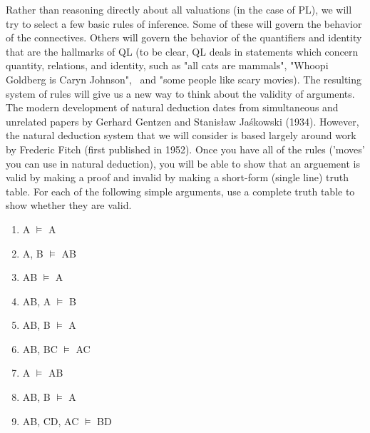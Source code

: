 Rather than reasoning directly about all valuations (in the case of PL), we will try to select a few basic rules of inference. Some of these will govern the behavior of the connectives. Others will govern the behavior of the quantifiers and identity that are the hallmarks of QL (to be clear, QL deals in statements which concern quantity, relations, and identity, such as "all cats are mammals", "Whoopi Goldberg is Caryn Johnson",  and "some people like scary movies). The resulting system of rules will give us a new way to think about the validity of arguments. The modern development of natural deduction dates from simultaneous and unrelated papers by Gerhard Gentzen and Stanisław Jaśkowski (1934). However, the natural deduction system that we will consider is based largely around work by Frederic Fitch (first published in 1952). Once you have all of the rules ('moves' you can use in natural deduction), you will be able to show that an arguement is valid by making a proof and invalid by making a short-form (single line) truth table. 
\practiceproblems
\problempart
\label{pr.basicinferencerulestables}
For each of the following simple arguments, use a complete truth table to show whether they are valid. 
\begin{enumerate}
\item A $\vDash$ A
\item A, B $\vDash$ A\eand B
\item A\eand B $\vDash$ A
\item A\eif B, A $\vDash$ B
\item A\eif B, \enot B $\vDash$ \enot A
\item A\eif B, B\eif C $\vDash$ A\eif C
\item A $\vDash$ A\eor B
\item A\eor B, \enot B $\vDash$ A
\item A\eif B, C\eif D, A\eor C $\vDash$ B\eor D
\end{enumerate}

